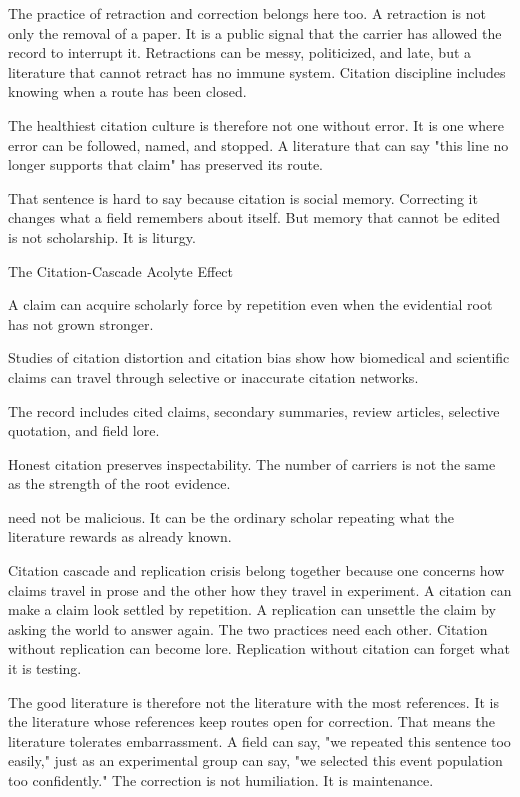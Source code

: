The practice of retraction and correction belongs here too. A retraction is
not only the removal of a paper. It is a public signal that the carrier has
allowed the record to interrupt it. Retractions can be messy, politicized, and
late, but a literature that cannot retract has no immune system. Citation
discipline includes knowing when a route has been closed.

The healthiest citation culture is therefore not one without error. It is one
where error can be followed, named, and stopped. A literature that can say
"this line no longer supports that claim" has preserved its route.

That sentence is hard to say because citation is social memory. Correcting it
changes what a field remembers about itself. But memory that cannot be edited
is not scholarship. It is liturgy.

\begin{phenom}{The Citation-Cascade Acolyte Effect~\cite{greenberg2009}}
\label{ph:citation-cascade}

\PhStatement
A claim can acquire scholarly force by repetition even when the evidential
root has not grown stronger.

\PhOrigin
Studies of citation distortion and citation bias show how biomedical and
scientific claims can travel through selective or inaccurate citation networks.

\PhObservation
The record includes cited claims, secondary summaries, review articles,
selective quotation, and field lore.

\PhConstraint
Honest citation preserves inspectability. The number of carriers is not the
same as the strength of the root evidence.

\PhConsequence
{} need not be malicious. It can be the ordinary scholar repeating
what the literature rewards as already known.
\end{phenom}

Citation cascade and replication crisis belong together because one concerns how
claims travel in prose and the other how they travel in experiment. A citation
can make a claim look settled by repetition. A replication can unsettle the
claim by asking the world to answer again. The two practices need each other.
Citation without replication can become lore. Replication without citation can
forget what it is testing.

The good literature is therefore not the literature with the most references.
It is the literature whose references keep routes open for correction. That
means the literature tolerates embarrassment. A field can say, "we repeated
this sentence too easily," just as an experimental group can say, "we
selected this event population too confidently." The correction is not
humiliation. It is maintenance.

